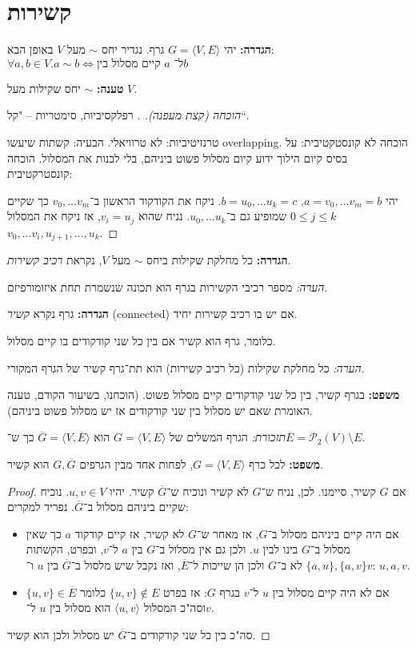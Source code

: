\documentclass[]{article}
\newcommand\ps    {\mathcal{P}}
\newcommand\ra    {\rangle}
\newcommand\la    {\langle}
\newcommand\ol    {\overline}
\begin{document}
	\section{קשירות}
	\textbf{הגדרה: }יהי $G = \la V, E \ra$ גרף. נגדיר יחס $\sim$ מעל $V$ באופן הבא: $\forall a, b \in V. a \sim b \iff \text{קיים מסלול בין $a$ ל־$b$}$
	
	\textbf{טענה: }$\sim$ יחס שקילות מעל $V$. 
	\begin{proof}[הוכחה (קצת מעפנה). ]
		רפלקסיביות, סימטריות – "קל``. 
		
		טרנזיטיביות: לא טרוויאלי. הבעיה: קשתות שיעשו overlapping. הוכחה לא קונסטקטיבית: על בסיס קיום הילוך ידוע קיום מסלול פשוט ביניהם, בלי לבנות את המסלול. הוכחה קונסטרקטיבית: 
		
		יהי $a = v_0, \dots v_m = b$, $b = u_0, \dots u_k = c$. ניקח את הקודקוד הראשון ב־$v_0, \dots v_m$ כך שקיים $0 \le j \le k$ שמופיע גם ב־$u_0, \dots u_k$. נניח שהוא $v_i = u_j$, אז ניקח את המסלול $v_0, \dots v_{i}, u_{j + 1},\dots, u_k$. 		
	\end{proof}
	\textbf{הגדרה: }כל מחלקת שקילות ביחס $\sim$ מעל $V$, נקראת \textit{רכיב קשירות}. 
	
	\textit{הערה: }מספר רכיבי הקשירות בגרף הוא תכונה שנשמרת תחת איזומורפיזם. 
	
	\textbf{הגדרה: }גרף נקרא \textit{קשיר} (connected) אם יש בו רכיב קשירות יחיד. 
	
	כלומר, גרף הוא קשיר אם בין כל שני קודקודים בו קיים מסלול. 
	
	\textit{הערה: }כל מחלקת שקילות (כל רכיב קשירות) הוא תת־גרף קשיר של הגרף המקורי. 
	
	\textbf{משפט: }בגרף קשיר, בין כל שני קודקודים קיים מסלול פשוט. 
	(הוכחנו, בשיעור הקודם, טענה האומרת שאם יש מסלול בין שני קודקודים אז יש מסלול פשוט ביניהם). 
	
	\textit{תזכורת: }הגרף המשלים של $G = \la V, E \ra$ הוא $\ol G = \la V, \ol E \ra$ כך ש־$\ol E = \ps_2(V) \setminus E$. 
	
	\textbf{משפט: }לכל כרף $G = \la V, E \ra$, לפחות אחד מבין הגרפים $G, \ol G$ הוא קשיר. 
	
	\begin{proof}
		אם $G$ קשיר, סיימנו. לכן, נניח ש־$G$ לא קשיר ונוכיח ש־$\ol G$ קשיר. יהיו $u, v \in V$. נוכיח שקיים ביניהם מסלול ב־$\ol G$. נפריד למקרים: 
		\begin{itemize}
			\item אם היה קיים ביניהם מסלול ב־$G$, אז מאחר ש־$G$ לא קשיר, אז קיים קודקוד $a$ כך שאין מסלול ב־$G$ בינו לבין $u$. ולכן גם אין מסלול ב־$G$ בין $a$ ל־$v$, ובפרט, הקשתות $\{a, u\}, \{a, v\}$ לא ב־$G$ ולכן הן שייכות ל־$\ol E$, ואז נקבל שיש מלסול ב־$\ol G$ בין $u$ ו־$v$: $u, a, v$. 
			\item אם לא היה קיים מסלול בין $u$ ל־$v$ בגרף $G$: אז בפרט $\{u, v\} \notin E$ כלומר $\{u, v\}\in \ol E$ וסה"כ המסלול $\la u, v \ra$ הוא מסלול בין $u$ ל־$v$. 
		\end{itemize}
		סה"כ בין כל שני קודקודים ב־$\ol G$ יש מסלול ולכן הוא קשיר. 
	\end{proof}
	
\end{document}
